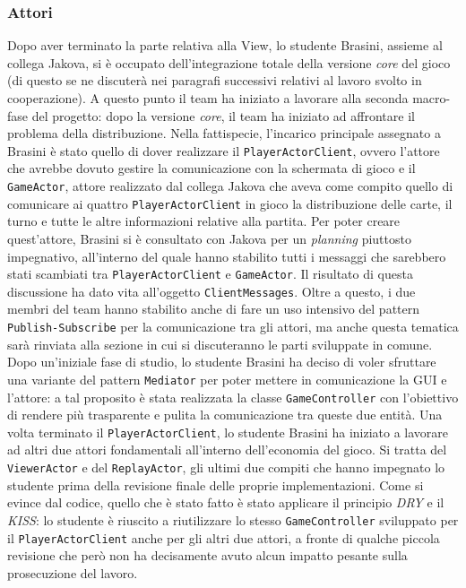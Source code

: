      \clearpage


      \subsubsection{Attori}\label{subsub:brasini:actors}
     Dopo aver terminato la parte relativa alla View, lo studente Brasini, assieme al collega Jakova, si è occupato dell'integrazione totale della versione \textit{core} del gioco (di questo se ne discuterà nei paragrafi successivi relativi al lavoro svolto in cooperazione). A questo punto il team ha iniziato a lavorare alla seconda macro-fase del progetto: dopo la versione \textit{core}, il team ha iniziato ad affrontare il problema della distribuzione. Nella fattispecie, l'incarico principale assegnato a Brasini è stato quello di dover realizzare il \texttt{PlayerActorClient}, ovvero l'attore che avrebbe dovuto gestire la comunicazione con la schermata di gioco e il \texttt{GameActor}, attore realizzato dal collega Jakova che aveva come compito quello di comunicare ai quattro \texttt{PlayerActorClient} in gioco la distribuzione delle carte, il turno e tutte le altre informazioni relative alla partita. Per poter creare quest'attore, Brasini si è consultato con Jakova per un \textit{planning} piuttosto impegnativo, all'interno del quale hanno stabilito tutti i messaggi che sarebbero stati scambiati tra \texttt{PlayerActorClient} e \texttt{GameActor}. Il risultato di questa discussione ha dato vita all'oggetto \texttt{ClientMessages}. Oltre a questo, i due membri del team hanno stabilito anche di fare un uso intensivo del pattern \texttt{Publish-Subscribe} per la comunicazione tra gli attori, ma anche questa tematica sarà rinviata alla sezione in cui si discuteranno le parti sviluppate in comune. Dopo un'iniziale fase di studio, lo studente Brasini ha deciso di voler sfruttare una variante del pattern \texttt{Mediator} per poter mettere in comunicazione la GUI e l'attore: a tal proposito è stata realizzata la classe \texttt{GameController} con l'obiettivo di rendere più trasparente e pulita la comunicazione tra queste due entità. Una volta terminato il \texttt{PlayerActorClient}, lo studente Brasini ha iniziato a lavorare ad altri due attori fondamentali all'interno dell'economia del gioco. Si tratta del \texttt{ViewerActor} e del \texttt{ReplayActor}, gli ultimi due compiti che hanno impegnato lo studente prima della revisione finale delle proprie implementazioni. Come si evince dal codice, quello che è stato fatto è stato applicare il principio \textit{DRY} e il \textit{KISS}: lo studente è riuscito a riutilizzare lo stesso \texttt{GameController} sviluppato per il \texttt{PlayerActorClient} anche per gli altri due attori, a fronte di qualche piccola revisione che però non ha decisamente avuto alcun impatto pesante sulla prosecuzione del lavoro.

